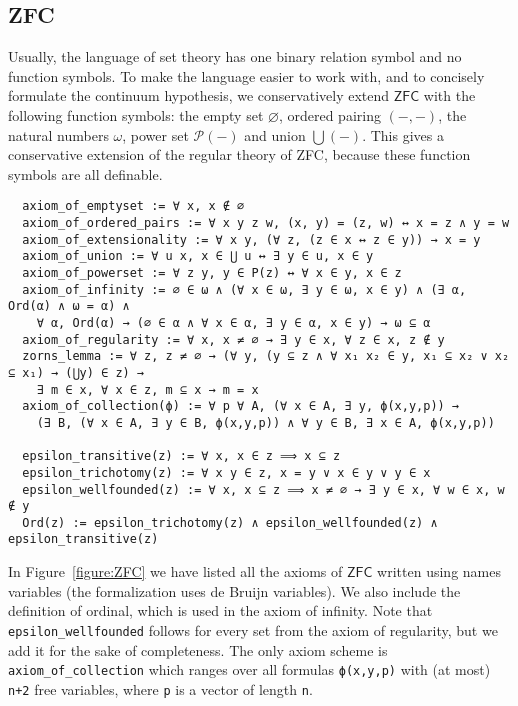 \documentclass[sigplan,screen]{acmart}
\newcommand{\ZFC}{\mathsf{ZFC}}
\theoremstyle{definition}
\begin{document}
\subsection{ZFC}
\label{subsect:fol:zfc}

Usually, the language of set theory has one binary relation symbol and no function symbols.
To make the language easier to work with, and to concisely formulate the continuum hypothesis, we conservatively extend \(\ZFC\) with the following function symbols: the empty set \(\varnothing\), ordered pairing \(({-},{-})\), the natural numbers \(\omega\), power set \(\mathcal{P}({-})\) and union \(\bigcup({-})\).
This gives a conservative extension of the regular theory of ZFC, because these function symbols are all definable.
\begin{figure*}
  \begin{center}
  \begin{minipage}{0.84\textwidth}
  \begin{lstlisting}
  axiom_of_emptyset := ∀ x, x ∉ ∅
  axiom_of_ordered_pairs := ∀ x y z w, (x, y) = (z, w) ↔ x = z ∧ y = w
  axiom_of_extensionality := ∀ x y, (∀ z, (z ∈ x ↔ z ∈ y)) → x = y
  axiom_of_union := ∀ u x, x ∈ ⋃ u ↔ ∃ y ∈ u, x ∈ y
  axiom_of_powerset := ∀ z y, y ∈ P(z) ↔ ∀ x ∈ y, x ∈ z
  axiom_of_infinity := ∅ ∈ ω ∧ (∀ x ∈ ω, ∃ y ∈ ω, x ∈ y) ∧ (∃ α, Ord(α) ∧ ω = α) ∧
    ∀ α, Ord(α) → (∅ ∈ α ∧ ∀ x ∈ α, ∃ y ∈ α, x ∈ y) → ω ⊆ α
  axiom_of_regularity := ∀ x, x ≠ ∅ → ∃ y ∈ x, ∀ z ∈ x, z ∉ y
  zorns_lemma := ∀ z, z ≠ ∅ → (∀ y, (y ⊆ z ∧ ∀ x₁ x₂ ∈ y, x₁ ⊆ x₂ ∨ x₂ ⊆ x₁) → (⋃y) ∈ z) →
    ∃ m ∈ x, ∀ x ∈ z, m ⊆ x → m = x
  axiom_of_collection(ϕ) := ∀ p ∀ A, (∀ x ∈ A, ∃ y, ϕ(x,y,p)) →
    (∃ B, (∀ x ∈ A, ∃ y ∈ B, ϕ(x,y,p)) ∧ ∀ y ∈ B, ∃ x ∈ A, ϕ(x,y,p))

  epsilon_transitive(z) := ∀ x, x ∈ z ⟹ x ⊆ z
  epsilon_trichotomy(z) := ∀ x y ∈ z, x = y ∨ x ∈ y ∨ y ∈ x
  epsilon_wellfounded(z) := ∀ x, x ⊆ z ⟹ x ≠ ∅ → ∃ y ∈ x, ∀ w ∈ x, w ∉ y
  Ord(z) := epsilon_trichotomy(z) ∧ epsilon_wellfounded(z) ∧ epsilon_transitive(z)
  \end{lstlisting}
  \end{minipage}
  \caption{Our formulation of ZFC.}
  \label{figure:ZFC}
  \end{center}
\end{figure*}

In Figure~\ref{figure:ZFC} we have listed all the axioms of \(\ZFC\) written using names variables (the formalization uses de Bruijn variables). We also include the definition of ordinal, which is used in the axiom of infinity. Note that \lstinline{epsilon_wellfounded} follows for every set from the axiom of regularity, but we add it for the sake of completeness. The only axiom scheme is \lstinline{axiom_of_collection} which ranges over all formulas \lstinline{ϕ(x,y,p)} with (at most) \lstinline{n+2} free variables, where \lstinline{p} is a vector of length \lstinline{n}.
\end{document}
